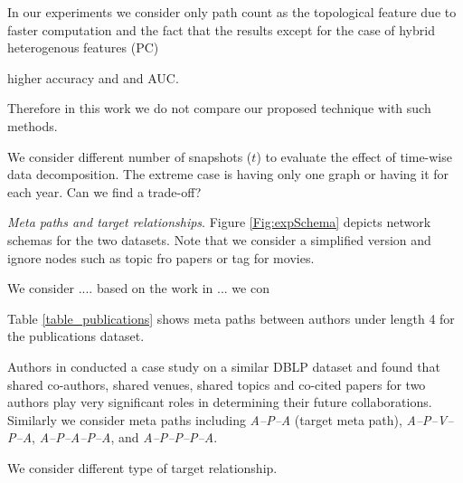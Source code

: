In our experiments we consider only path count as the topological feature due to faster computation and the fact that the results except for the case of hybrid heterogenous features (PC) 

higher accuracy and and AUC.

\cite{liben2007link}

Therefore in this work we do not compare our proposed technique with such methods.

We consider different number of snapshots ($t$) to evaluate the effect of time-wise data decomposition. The extreme case is having only one graph or having it for each year. Can we find a trade-off?


\textit{Meta paths and target relationships}. Figure \ref{Fig:expSchema} depicts network schemas for the two datasets. Note that we consider a simplified version and ignore nodes such as topic fro papers or tag for movies.

We consider .... based on the work in ... we con


Table \ref{table_publications} shows meta paths between authors under length 4 for the publications dataset.


Authors in \cite{sun2011ASONAM} conducted a case study on a similar DBLP dataset and found that shared co-authors, shared venues, shared topics and co-cited papers for two authors play very significant roles in determining their future collaborations. Similarly we consider meta paths including \textit{A--P--A} (target meta path), \textit{A--P--V--P--A}, \textit{A--P--A--P--A}, and \textit{A--P--P--P--A}.

We consider different type of target relationship.


